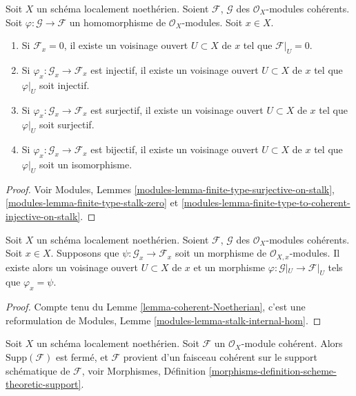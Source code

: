 \begin{lemma}
\label{lemma-local-isomorphism}
Soit $X$ un schéma localement noethérien.
Soient $\mathcal{F}$, $\mathcal{G}$ des $\mathcal{O}_X$-modules cohérents.
Soit $\varphi : \mathcal{G} \to \mathcal{F}$ un homomorphisme
de $\mathcal{O}_X$-modules. Soit $x \in X$.
\begin{enumerate}
\item Si $\mathcal{F}_x = 0$, il existe un voisinage ouvert
$U \subset X$ de $x$ tel que $\mathcal{F}|_U = 0$.
\item Si $\varphi_x : \mathcal{G}_x \to \mathcal{F}_x$ est injectif,
il existe un voisinage ouvert $U \subset X$ de $x$ tel que
$\varphi|_U$ soit injectif.
\item Si $\varphi_x : \mathcal{G}_x \to \mathcal{F}_x$ est surjectif,
il existe un voisinage ouvert $U \subset X$ de $x$ tel que
$\varphi|_U$ soit surjectif.
\item Si $\varphi_x : \mathcal{G}_x \to \mathcal{F}_x$ est bijectif,
il existe un voisinage ouvert $U \subset X$ de $x$ tel que
$\varphi|_U$ soit un isomorphisme.
\end{enumerate}
\end{lemma}

\begin{proof}
Voir Modules, Lemmes
\ref{modules-lemma-finite-type-surjective-on-stalk},
\ref{modules-lemma-finite-type-stalk-zero} et
\ref{modules-lemma-finite-type-to-coherent-injective-on-stalk}.
\end{proof}

\begin{lemma}
\label{lemma-map-stalks-local-map}
Soit $X$ un schéma localement noethérien.
Soient $\mathcal{F}$, $\mathcal{G}$ des $\mathcal{O}_X$-modules cohérents.
Soit $x \in X$.
Supposons que $\psi : \mathcal{G}_x \to \mathcal{F}_x$ soit un morphisme de
$\mathcal{O}_{X, x}$-modules.
Il existe alors un voisinage ouvert $U \subset X$ de $x$ et un morphisme
$\varphi : \mathcal{G}|_U \to \mathcal{F}|_U$ tels que
$\varphi_x = \psi$.
\end{lemma}

\begin{proof}
Compte tenu du Lemme \ref{lemma-coherent-Noetherian},
c'est une reformulation de
Modules, Lemme \ref{modules-lemma-stalk-internal-hom}.
\end{proof}

\begin{lemma}
\label{lemma-coherent-support-closed}
Soit $X$ un schéma localement noethérien. Soit $\mathcal{F}$ un
$\mathcal{O}_X$-module cohérent. Alors $\text{Supp}(\mathcal{F})$ est fermé, et
$\mathcal{F}$ provient d'un faisceau cohérent sur le support schématique
de $\mathcal{F}$, voir
Morphismes, Définition \ref{morphisms-definition-scheme-theoretic-support}.
\end{lemma}


